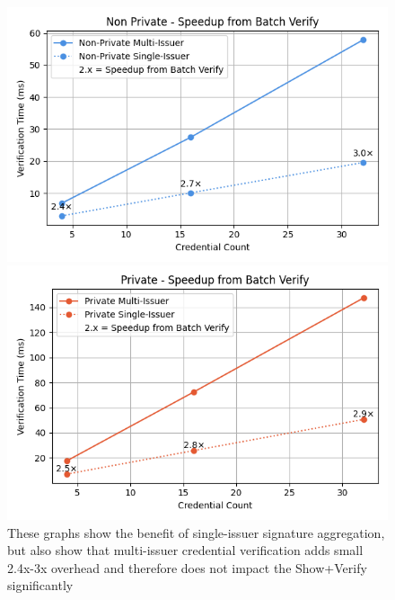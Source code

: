 \begin{figure}
    \centering
   
    \begin{minipage}{0.48\textwidth}
        \centering
        \includegraphics[width=\textwidth]{figures/chap3_nonprivate_batch_speedup.png}
    \end{minipage}
    \hfill
    \begin{minipage}{0.48\textwidth}
        \centering
        \includegraphics[width=\textwidth]{figures/chap3_private_batch_speedup.png}
    \end{minipage}
    
    \caption[Signature Aggregation/Batch Verification Speedup for Multi-Credential Verifiable Presentations]{These graphs show the benefit of single-issuer signature aggregation, but also show that multi-issuer credential verification adds small 2.4x-3x overhead and therefore does not impact the Show+Verify significantly}
    \label{fig:chap3_batch_verify_improvements}
\end{figure}




